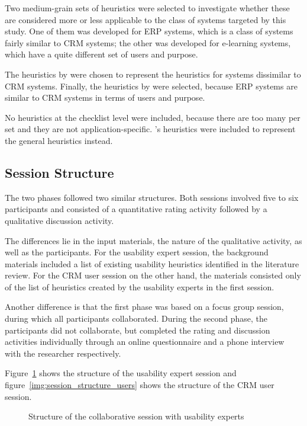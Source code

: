 Two medium-grain sets of heuristics were selected to investigate whether these are considered more or less applicable to the class of systems targeted by this study. One of them was developed for ERP systems, which is a class of systems fairly similar to CRM systems; the other was developed for e-learning systems, which have a quite different set of users and purpose.

The heuristics by \citet{Ardito2006} were chosen to represent the heuristics for systems dissimilar to CRM systems. Finally, the heuristics by \citet{Singh2009} were selected, because ERP systems are similar to CRM systems in terms of users and purpose.

No heuristics at the checklist level were included, because there are too many per set and they are not application-specific. 's heuristics were included to represent the general heuristics instead.

\subsection{Session Structure}
\label{sec:session_structure}
The two phases followed two similar structures. Both sessions involved five to six participants and consisted of a quantitative rating activity followed by a qualitative discussion activity.

The differences lie in the input materials, the nature of the qualitative activity, as well as the participants. For the usability expert session, the background materials included a list of existing usability heuristics identified in the literature review. For the CRM user session on the other hand, the materials consisted only of the list of heuristics created by the usability experts in the first session.

Another difference is that the first phase was based on a focus group session, during which all participants collaborated. During the second phase, the participants did not collaborate, but completed the rating and discussion activities individually through an online questionnaire and a phone interview with the researcher respectively.

Figure~\ref{img:session_structure_experts} shows the structure of the usability expert session and figure~\ref{img:session_structure_users} shows the structure of the CRM user session.

\begin{figure}[htbp]
	\centering
	
	\caption{Structure of the collaborative session with usability experts}
	\label{img:session_structure_experts}
\end{figure}


